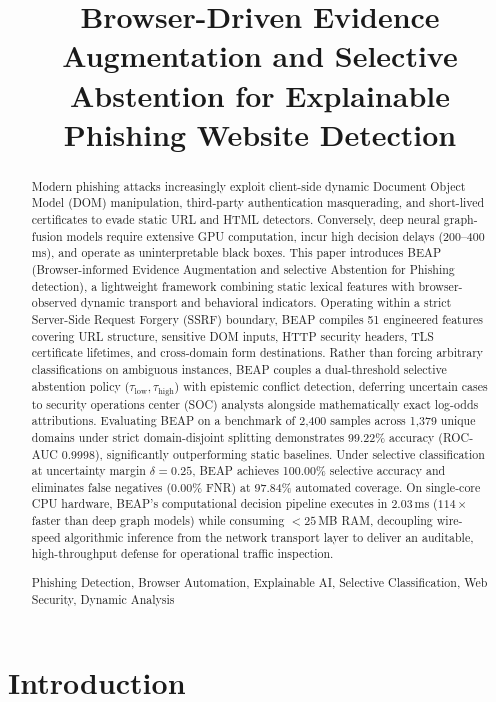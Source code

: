 \documentclass[conference]{IEEEtran}
\title{Browser-Driven Evidence Augmentation and Selective Abstention for Explainable Phishing Website Detection}
\author{\IEEEauthorblockN{Anonymous Author(s)}
\IEEEauthorblockA{Anonymous Institution for Review}}
\begin{document}
\maketitle

\begin{abstract}
Modern phishing attacks increasingly exploit client-side dynamic Document Object Model (DOM) manipulation, third-party authentication masquerading, and short-lived certificates to evade static URL and HTML detectors. Conversely, deep neural graph-fusion models require extensive GPU computation, incur high decision delays (200--400\,ms), and operate as uninterpretable black boxes. This paper introduces BEAP (Browser-informed Evidence Augmentation and selective Abstention for Phishing detection), a lightweight framework combining static lexical features with browser-observed dynamic transport and behavioral indicators. Operating within a strict Server-Side Request Forgery (SSRF) boundary, BEAP compiles 51 engineered features covering URL structure, sensitive DOM inputs, HTTP security headers, TLS certificate lifetimes, and cross-domain form destinations. Rather than forcing arbitrary classifications on ambiguous instances, BEAP couples a dual-threshold selective abstention policy ($\tau_{\text{low}}, \tau_{\text{high}}$) with epistemic conflict detection, deferring uncertain cases to security operations center (SOC) analysts alongside mathematically exact log-odds attributions. Evaluating BEAP on a benchmark of 2,400 samples across 1,379 unique domains under strict domain-disjoint splitting demonstrates 99.22\% accuracy (ROC-AUC 0.9998), significantly outperforming static baselines. Under selective classification at uncertainty margin $\delta = 0.25$, BEAP achieves 100.00\% selective accuracy and eliminates false negatives (0.00\% FNR) at 97.84\% automated coverage. On single-core CPU hardware, BEAP's computational decision pipeline executes in 2.03\,ms ($114\times$ faster than deep graph models) while consuming $<25$\,MB RAM, decoupling wire-speed algorithmic inference from the network transport layer to deliver an auditable, high-throughput defense for operational traffic inspection.
\begin{IEEEkeywords}
Phishing Detection, Browser Automation, Explainable AI, Selective Classification, Web Security, Dynamic Analysis
\end{IEEEkeywords}
\end{abstract}

\section{Introduction}\label{introduction}
\end{document}
